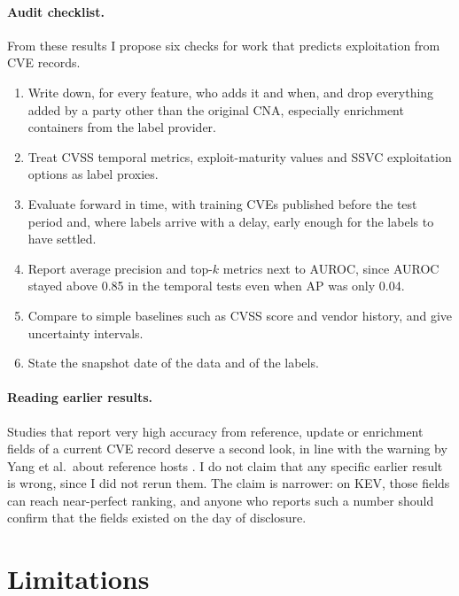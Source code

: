 \documentclass[11pt,a4paper]{article}
\begin{document}
\paragraph{Audit checklist.} From these results I propose six checks for work that predicts exploitation from CVE records.
\begin{enumerate}
\item Write down, for every feature, who adds it and when, and drop everything added by a party other than the original CNA, especially enrichment containers from the label provider.
\item Treat CVSS temporal metrics, exploit-maturity values and SSVC exploitation options as label proxies.
\item Evaluate forward in time, with training CVEs published before the test period and, where labels arrive with a delay, early enough for the labels to have settled.
\item Report average precision and top-$k$ metrics next to AUROC, since AUROC stayed above 0.85 in the temporal tests even when AP was only 0.04.
\item Compare to simple baselines such as CVSS score and vendor history, and give uncertainty intervals.
\item State the snapshot date of the data and of the labels.
\end{enumerate}

\paragraph{Reading earlier results.} Studies that report very high accuracy from reference, update or enrichment fields of a current CVE record deserve a second look, in line with the warning by Yang et al.\ about reference hosts \cite{yang2020}. I do not claim that any specific earlier result is wrong, since I did not rerun them. The claim is narrower: on KEV, those fields can reach near-perfect ranking, and anyone who reports such a number should confirm that the fields existed on the day of disclosure.

\section{Limitations}
\label{sec:limits}
\end{document}
